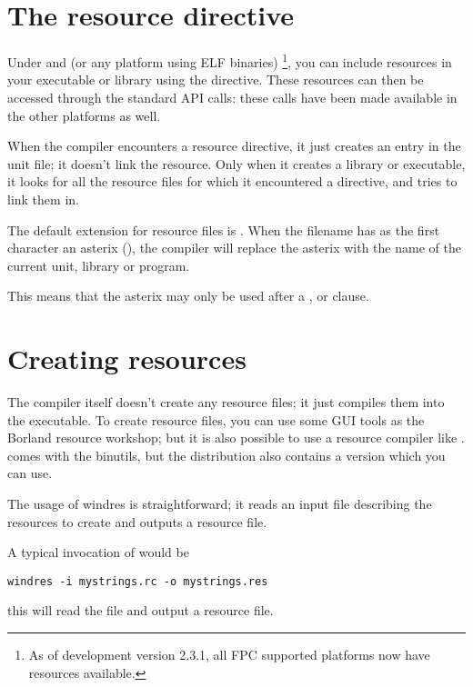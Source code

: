 \section{The resource directive }

Under \windows and \linux (or any platform using ELF binaries)
\footnote{As of development version 2.3.1, all FPC supported 
platforms now have resources available.}, 
you can include resources in your executable or library using 
the  directive. These resources can then
be accessed through the standard \windows API calls: these calls
have been made available in the other platforms as well.


When the compiler encounters a resource directive, it just creates an
entry in the unit  file; it doesn't link the resource. Only
when it creates a library or executable, it looks for all the resource
files for which it encountered a directive, and tries to link them in.

The default extension for resource files is . When the
filename has as the first character an asterix (\var{*}), the
compiler will replace the asterix with the name of the current unit,
library or program.

\begin{remark}This means that the asterix may only be used after a ,
 or  clause.
\end{remark}

\section{Creating resources}

The \fpc compiler itself doesn't create any resource files; it just
compiles them into the executable. To create resource files, you
can use some GUI tools as the Borland resource workshop; but it is
also possible to use a \windows resource compiler like \gnu
{}.  comes with the \gnu binutils, but the
\fpc distribution also contains a version which you can use.

The usage of windres is straightforward; it reads an input file
describing the resources to create and outputs a resource file.

A typical invocation of  would be
\begin{verbatim}
windres -i mystrings.rc -o mystrings.res
\end{verbatim}
this will read the  file and output a
 resource file.

